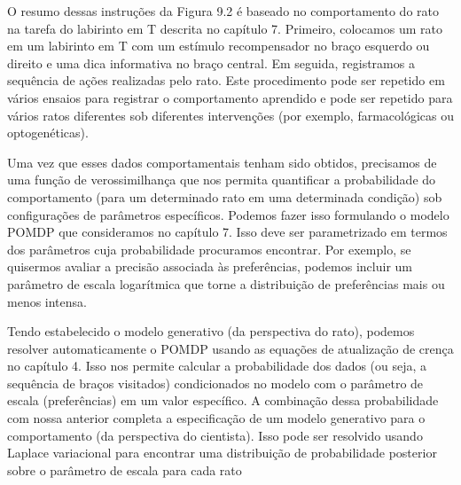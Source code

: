 \documentclass[
  12pt,
]{book}
\begin{document}
O resumo dessas instruções da Figura 9.2 é baseado no comportamento do rato na tarefa do labirinto em T descrita no capítulo 7. Primeiro, colocamos um rato em um labirinto em T com um estímulo recompensador no braço esquerdo ou direito e uma dica informativa no braço central. Em seguida, registramos a sequência de ações realizadas pelo rato. Este procedimento pode ser repetido em vários ensaios para registrar o comportamento aprendido e pode ser repetido para vários ratos diferentes sob diferentes intervenções (por exemplo, farmacológicas ou optogenéticas).

Uma vez que esses dados comportamentais tenham sido obtidos, precisamos de uma função de verossimilhança que nos permita quantificar a probabilidade do comportamento (para um determinado rato em uma determinada condição) sob configurações de parâmetros específicos. Podemos fazer isso formulando o modelo POMDP que consideramos no capítulo 7. Isso deve ser parametrizado em termos dos parâmetros cuja probabilidade procuramos encontrar. Por exemplo, se quisermos avaliar a precisão associada às preferências, podemos incluir um parâmetro de escala logarítmica que torne a distribuição de preferências mais ou menos intensa.

Tendo estabelecido o modelo generativo (da perspectiva do rato), podemos resolver automaticamente o POMDP usando as equações de atualização de crença no capítulo 4. Isso nos permite calcular a probabilidade dos dados (ou seja, a sequência de braços visitados) condicionados no modelo com o parâmetro de escala (preferências) em um valor específico. A combinação dessa probabilidade com nossa anterior completa a especificação de um modelo generativo para o comportamento (da perspectiva do cientista). Isso pode ser resolvido usando Laplace variacional para encontrar uma distribuição de probabilidade posterior sobre o parâmetro de escala para cada rato
\end{document}
